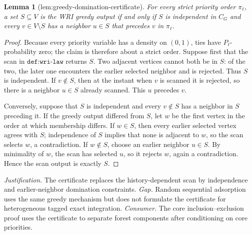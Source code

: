 \documentclass{article}
\newtheorem{lemma}{Lemma}
\begin{document}
\begin{lemma}[lem:greedy-domination-certificate]\label{lem:greedy-domination-certificate}
For every strict priority order \(\pi_{\ell}\), a set \(S\subseteq V\) is the WRI greedy output if and only if \(S\) is independent in \(C_G\) and every \(v\in V\setminus S\) has a neighbor \(u\in S\) that precedes \(v\) in \(\pi_{\ell}\).
\end{lemma}
\begin{proof}
Because every priority variable has a density on \((0,1)\), ties have \(P_\ell\)-probability zero; the claim is therefore about a strict order.  Suppose first that the scan in \(\texttt{def:wri-law}\) returns \(S\).  Two adjacent vertices cannot both be in \(S\): of the two, the later one encounters the earlier selected neighbor and is rejected.  Thus \(S\) is independent.  If \(v\notin S\), then at the instant when \(v\) is scanned it is rejected, so there is a neighbor \(u\in S\) already scanned.  This \(u\) precedes \(v\).

Conversely, suppose that \(S\) is independent and every \(v\notin S\) has a neighbor in \(S\) preceding it.  If the greedy output differed from \(S\), let \(w\) be the first vertex in the order at which membership differs.  If \(w\in S\), then every earlier selected vertex agrees with \(S\); independence of \(S\) implies that none is adjacent to \(w\), so the scan selects \(w\), a contradiction.  If \(w\notin S\), choose an earlier neighbor \(u\in S\).  By minimality of \(w\), the scan has selected \(u\), so it rejects \(w\), again a contradiction.  Hence the scan output is exactly \(S\).
\end{proof}
\par\smallskip\noindent \textit{Justification.} The certificate replaces the history-dependent scan by independence and earlier-neighbor domination constraints. \textit{Gap.} Random sequential adsorption uses the same greedy mechanism but does not formulate the certificate for heterogeneous tagged exact integration. \textit{Consumer.} The core inclusion--exclusion proof uses the certificate to separate forest components after conditioning on core priorities.
\end{document}
